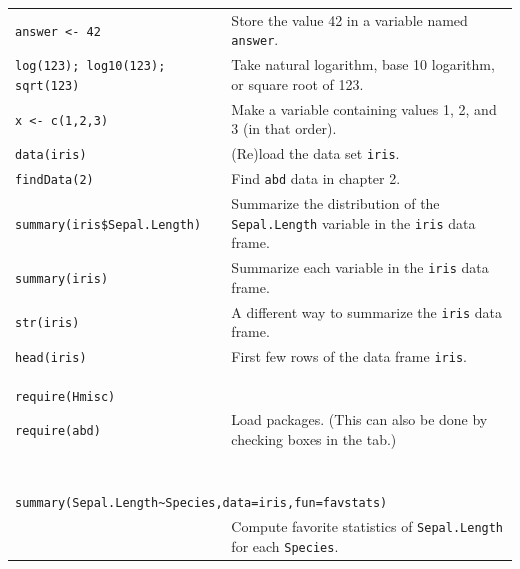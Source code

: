 \vspace{-3mm}
\begin{center}
\begin{longtable}{p{2.45in}p{4.10in}}
\verb!answer <- 42! & Store the value 42 in a variable named \verb!answer!.
\\[3mm]
\verb!log(123); log10(123); sqrt(123)! & Take natural logarithm, base 10 logarithm, or square 
root of 123.
\\[3mm]
\verb!x <- c(1,2,3)! & Make a variable containing values 1, 2, and 3 (in that order).
\\[3mm]
\verb!data(iris)! & (Re)load the data set \verb!iris!.
\\[3mm]
\verb!findData(2)! & Find \verb!abd! data in chapter 2.
\\[3mm]
\verb!summary(iris$Sepal.Length)! & 
Summarize the distribution of the \verb!Sepal.Length! variable in the \verb!iris! data
frame.
\\[3mm]
\verb!summary(iris)! & 
Summarize each variable in the \verb!iris! data frame.
\\[3mm]
\verb!str(iris)! & A different way to summarize the \verb!iris! data frame.
\\[3mm]
\verb!head(iris)! & First few rows of the data frame \verb!iris!.
\\[3mm]
\verb!require(Hmisc)!

\verb!require(abd)!

\ 
& Load packages.  
(This can also be done by checking boxes in the \tab{Packages} tab.)
\\[3mm]
\multicolumn{2}{l}{
\texttt{summary(Sepal.Length\~{}Species,data=iris,fun=favstats) } 
}
\\[1mm]
& 
Compute favorite statistics of \verb!Sepal.Length! for each \verb!Species!.


\end{longtable}
\end{center}
